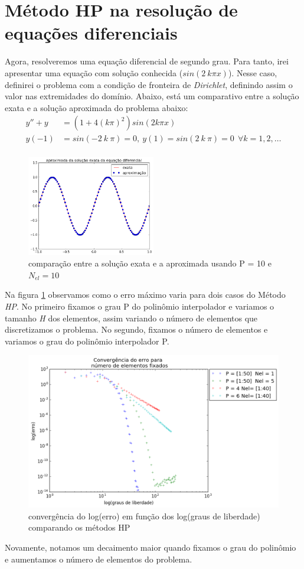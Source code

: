 \section{Método HP na resolução de equações diferenciais}

 Agora, resolveremos uma equação diferencial de segundo grau. Para tanto, irei apresentar uma equação com solução conhecida ($sin(2\ k \pi x)$). Nesse caso, definirei o problema com a condição de fronteira de \emph{Dirichlet}, definindo assim o valor nas extremidades do domínio. Abaixo, está um comparativo entre a solução exata e a solução aproximada do problema abaixo:
\begin{align}
y'' + y &= (1 + 4 (k \pi)^2)sin(2 k \pi x) \\
y(-1) &= sin(-2\ k \ \pi ) = 0 ,\ y(1) = sin(2\ k\ \pi) = 0 \ \ \forall k = 1,2,\dots \\
\end{align}	
\begin{figure}[H]
\centering
\includegraphics[width=0.5\textwidth,center]{figuras/solu_edo_simul.png}
\caption{comparação entre a solução exata e a aproximada usando P = 10 e $N_{el} = 10$ } 
\end{figure}
Na figura \ref{fig:convD} observamos  como o erro máximo varia para dois casos do Método \emph{HP}. No primeiro fixamos o grau P do polinômio interpolador e variamos o tamanho \emph{H} dos elementos, assim variando o número de elementos que discretizamos o problema. No segundo,  fixamos o número de elementos e variamos o grau do polinômio interpolador P.
\begin{figure}[H]
  \includegraphics[width=.9 \textwidth,center]{figuras/convergencia_erro_HP.png}
  \caption{convergência do log(erro) em função dos log(graus de liberdade) comparando os métodos HP }
\label{fig:convD}
\end{figure}
 Novamente, notamos um decaimento maior quando fixamos o grau do polinômio e aumentamos o número de elementos do problema.
